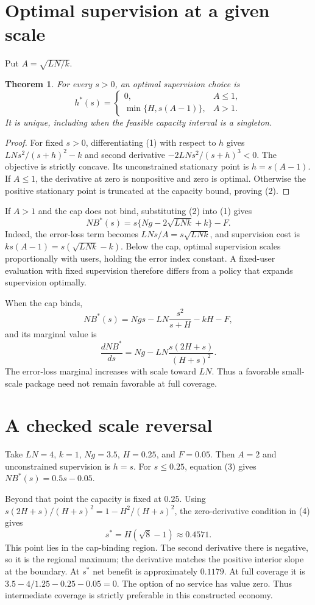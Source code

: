 \documentclass[11pt,a4paper]{article}
\newtheorem{theorem}{Theorem}[section]
\begin{document}
\section{Optimal supervision at a given scale}
Put $A=\sqrt{LN/k}$.
\begin{theorem}
For every $s>0$, an optimal supervision choice is
\[
 h^*(s)=
 \begin{cases}
 0,&A\le1,\\
 \min\{H,s(A-1)\},&A>1.
 \end{cases}
 \tag{2}
\]
It is unique, including when the feasible capacity interval is a singleton.
\end{theorem}
\begin{proof}
For fixed $s>0$, differentiating (1) with respect to $h$ gives
$LN s^2/(s+h)^2-k$ and second derivative
$-2LN s^2/(s+h)^3<0$.
The objective is strictly concave. Its unconstrained stationary point is $h=s(A-1)$. If $A\le1$, the derivative at zero is nonpositive and zero is optimal. Otherwise the positive stationary point is truncated at the capacity bound, proving (2).
\end{proof}
If $A>1$ and the cap does not bind, substituting (2) into (1) gives
\[
 NB^*(s)=
 s\{Ng-2\sqrt{LNk}+k\}-F.
 \tag{3}
\]
Indeed, the error-loss term becomes $LN s/A=s\sqrt{LNk}$, and supervision cost is $ks(A-1)=s(\sqrt{LNk}-k)$. Below the cap, optimal supervision scales proportionally with users, holding the error index constant. A fixed-user evaluation with fixed supervision therefore differs from a policy that expands supervision optimally.

When the cap binds,
\[
 NB^*(s)=Ngs-LN\frac{s^2}{s+H}-kH-F,
\]
and its marginal value is
\[
 \frac{dNB^*}{ds}
 =Ng-LN\frac{s(2H+s)}{(H+s)^2}.
 \tag{4}
\]
The error-loss marginal increases with scale toward $LN$. Thus a favorable small-scale package need not remain favorable at full coverage.
\section{A checked scale reversal}
Take $LN=4$, $k=1$, $Ng=3.5$, $H=0.25$, and $F=0.05$. Then $A=2$ and unconstrained supervision is $h=s$. For $s\le0.25$, equation (3) gives $NB^*(s)=0.5s-0.05$.

Beyond that point the capacity is fixed at $0.25$. Using
$s(2H+s)/(H+s)^2=1-H^2/(H+s)^2$,
the zero-derivative condition in (4) gives
\[
 s^*=H(\sqrt8-1)\approx0.4571.
\]
This point lies in the cap-binding region. The second derivative there is negative, so it is the regional maximum; the derivative matches the positive interior slope at the boundary. At $s^*$ net benefit is approximately $0.1179$. At full coverage it is
$3.5-4/1.25-0.25-0.05=0$.
The option of no service has value zero. Thus intermediate coverage is strictly preferable in this constructed economy.
\end{document}
